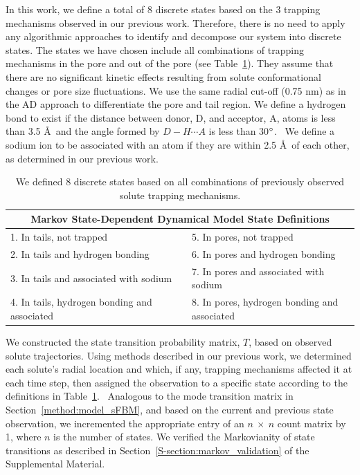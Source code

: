 \documentclass[aps,pre,preprint,groupedaddress,longbibliography]{revtex4-2}
\begin{document}
  In this work, we define a total of 8 discrete states based on the 3 trapping
  mechanisms observed in our previous work. Therefore, there is no need to
  apply any algorithmic approaches to identify and decompose our system into
  discrete states. The states we have chosen include all combinations of
  trapping mechanisms in the pore and out of the pore (see
  Table~\ref{table:states}). They assume that there are no significant kinetic
  effects resulting from solute conformational changes or pore size
  fluctuations. We use the same radial cut-off (0.75 nm) as in the AD approach to
  differentiate the pore and tail region. We define a hydrogen bond to exist
  if the distance between donor, D, and acceptor, A, atoms is less than 3.5
  \AA~and the angle formed by $D-H \cdots A$ is less than
  30$\degree$.~\cite{luzar_effect_1996} We define a sodium ion to be associated
  with an atom if they are within 2.5 \AA~of each other, as determined in our
  previous work.~\cite{coscia_chemically_2019}
  
  \begin{table}[!htb]
	  \centering
	  \begin{tabular}{ll}
            \hline
            \hline
	  \multicolumn{2}{c}{Markov State-Dependent Dynamical Model State Definitions} \\
	  \hline
	  1. In tails, not trapped                      & 5. In pores, not trapped                     \\
	  2. In tails and hydrogen bonding              & 6. In pores and hydrogen bonding             \\
	  3. In tails and associated with sodium        & 7. In pores and associated with sodium       \\
	  4. In tails, hydrogen bonding and associated  ~~~~& 8. In pores, hydrogen bonding and associated \\
	  \hline
          \hline
	  \end{tabular}
	  \caption{We defined 8 discrete states based on all combinations of previously observed solute
	  trapping mechanisms.}\label{table:states}  
  \end{table}
  
  We constructed the state transition probability matrix, $T$, based on
  observed solute trajectories. Using methods described in our previous work,
  we determined each solute's radial location and which, if any, trapping
  mechanisms affected it at each time step, then assigned the observation to a
  specific state according to the definitions in
  Table~\ref{table:states}.~\cite{coscia_chemically_2019} Analogous to the mode
  transition matrix in Section~\ref{method:model_sFBM}, and based on the
  current and previous state observation, we incremented the appropriate entry
  of an $n~\times~n$ count matrix by 1, where $n$ is the number of states. We
  verified the Markovianity of state transitions as described in
  Section~\ref{S-section:markov_validation} of the Supplemental Material.
  
\end{document}
